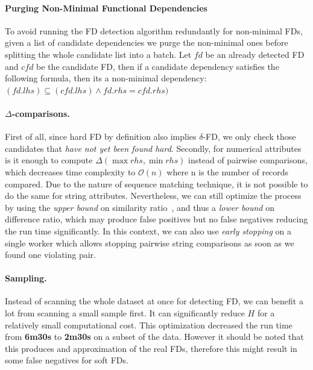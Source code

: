 \documentclass{article}
\begin{document}
        \paragraph{Purging Non-Minimal Functional Dependencies}
        To avoid running the FD detection algorithm redundantly for non-minimal FDs, given a list of candidate dependencies we purge the non-minimal ones before splitting the whole candidate list into a batch. Let $fd$ be an already detected FD and $cfd$ be the candidate FD, then if a candidate dependency satisfies the following formula, then its a non-minimal dependency: ${(fd.lhs) \subseteq (cfd.lhs) \wedge fd.rhs = cfd.rhs)}$

        \paragraph{$\Delta$-comparisons.} 
        
        First of all, since hard FD by definition also implies $\delta$-FD, we only check those candidates that \textit{have not yet been found hard}. Secondly, for numerical attributes is it enough to compute $\Delta(\max rhs, \min rhs)$ instead of pairwise comparisons, which decreases time complexity to $\mathcal{O}(n)$ where n is the number of records compared. Due to the nature of sequence matching technique, it is not possible to do the same for string attributes. Nevertheless, we can still optimize the process by using the \textit{upper bound} on similarity ratio~\cite{difflib}, and thus a \textit{lower bound} on difference ratio, which may produce false positives but no false negatives reducing the run time significantly. In this context, we can also use \textit{early stopping} on a single worker which allows stopping pairwise string comparisons as soon as we found one violating pair.

        \paragraph{Sampling.}
        
        Instead of scanning the whole dataset at once for detecting FD, we can benefit a lot from scanning a small sample first. It can significantly reduce $H$ for a relatively small computational cost. This optimization decreased the run time from \textbf{6m30s} to \textbf{2m30s} on a subset of the data. However it should be noted that this produces and approximation of the real FDs, therefore this might result in some false negatives for soft FDs.
        
\end{document}
